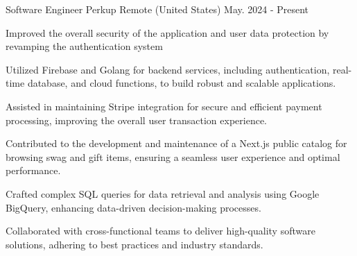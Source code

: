 

\begin{cventries}

\cventry
{Software Engineer} %
{Perkup} %
{Remote (United States)} %
{May. 2024 - Present} %
{
  \begin{cvitems} %
    \item{Improved the overall security of the application and user data protection by revamping the authentication system}
    \item{Utilized Firebase and Golang for backend services, including authentication, real-time database, and cloud functions, to build robust and scalable applications.}
    \item{Assisted in maintaining Stripe integration for secure and efficient payment processing, improving the overall user transaction experience.}
    \item{Contributed to the development and maintenance of a Next.js public catalog for browsing swag and gift items, ensuring a seamless user experience and optimal performance.}
    \item{Crafted complex SQL queries for data retrieval and analysis using Google BigQuery, enhancing data-driven decision-making processes.}
    \item{Collaborated with cross-functional teams to deliver high-quality software solutions, adhering to best practices and industry standards.}
  \end{cvitems}
}



\end{cventries}
